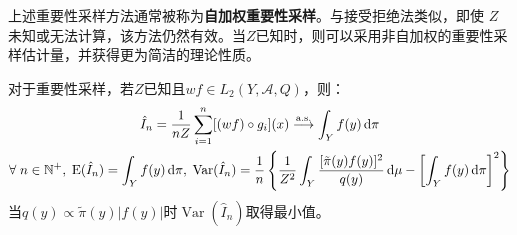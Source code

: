上述重要性采样方法通常被称为\textbf{自加权重要性采样}。与接受拒绝法类似，即使 $Z$未知或无法计算，该方法仍然有效。当$Z$已知时，则可以采用非自加权的重要性采样估计量，并获得更为简洁的理论性质。
\begin{property}\label{prop:ImportanceSampling}
	对于重要性采样，若$Z$已知且$wf\in L_2(Y,\mathscr{A},Q)$，则：
	\begin{gather*}
		\hat{I}_n=\frac{1}{nZ}\sum_{i=1}^{n}[(wf)\circ g_i](x)\overset{\text{a.s.}}{\longrightarrow}\int_{Y}f(y)\mathop{}\!\mathrm{d}\pi \\
		\forall\;n\in\mathbb{N}^+,\;\operatorname{E}(\hat{I}_n)=\int_{Y}f(y)\mathop{}\!\mathrm{d}\pi,\;\operatorname{Var}(\hat{I}_n)=\frac{1}{n}\left\{\frac{1}{Z^2}\int_{Y}\frac{[\tilde{\pi}(y)f(y)]^2}{q(y)}\mathop{}\!\mathrm{d}\mu-\left[\int_{Y}f(y)\mathop{}\!\mathrm{d}\pi\right]^2\right\}
	\end{gather*}
	当$q(y)\propto\tilde{\pi}(y)|f(y)|$时$\operatorname{Var}(\hat{I}_n)$取得最小值。
\end{property}
